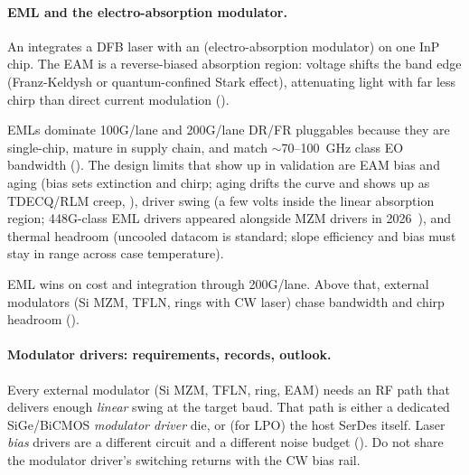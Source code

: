 \paragraph{EML and the electro-absorption modulator.}
\label{sec:eml-eam}

An  integrates a DFB laser with an 
(electro-absorption modulator) on one InP chip. The EAM is a reverse-biased
absorption region: voltage shifts the band edge (Franz-Keldysh or quantum-confined
Stark effect), attenuating light with far less chirp than direct current modulation
().

EMLs dominate 100G/lane and 200G/lane DR/FR pluggables because they are single-chip,
mature in supply chain, and match $\sim$70--100~GHz class EO bandwidth
(). The design limits that show up in validation are EAM
bias and aging (bias sets extinction and chirp; aging drifts the curve and shows
up as TDECQ/RLM creep, ), driver swing (a few
volts inside the linear absorption region; 448G-class EML drivers appeared
alongside MZM drivers in 2026~), and thermal headroom
(uncooled datacom is standard; slope efficiency and bias must stay in range
across case temperature).

EML wins on cost and integration through 200G/lane. Above that, external modulators
(Si MZM, TFLN, rings with CW laser) chase bandwidth and chirp headroom
().

\paragraph{Modulator drivers: requirements, records, outlook.}
\label{sec:drivers}

Every external modulator (Si MZM, TFLN, ring, EAM) needs an RF path that delivers
enough \emph{linear} swing at the target baud. That path is either a dedicated
SiGe/BiCMOS \emph{modulator driver} die, or (for LPO) the host SerDes itself.
Laser \emph{bias} drivers are a different circuit and a different noise budget
(). Do not share the modulator driver's switching returns
with the CW bias rail.


